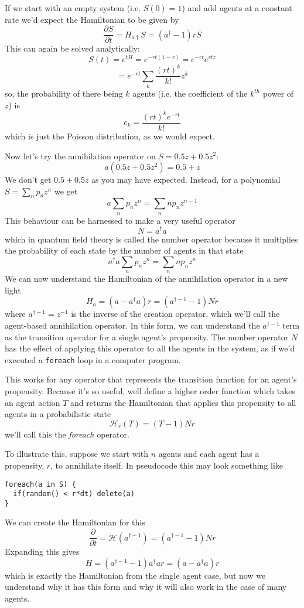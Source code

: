 \documentclass[letterpaper,twocolumn,10pt]{article}
\begin{document}
If we start with an empty system (i.e. $S(0) = 1$) and add agents at a constant rate we'd expect the Hamiltonian to be given by
\[
\frac{\partial S}{\partial t} = H_{a\dag}S = (a^\dag - 1)rS
\]
This can again be solved analytically:
\[
S(t) = e^{tH} = e^{-rt(1-z)} = e^{-rt}e^{rtz}
\]
\[
= e^{-rt}\sum_k \frac{(rt)^k}{k!}z^k
\]
so, the probability of there being $k$ agents (i.e. the coefficient of the $k^{th}$ power of $z$) is 
\[
c_k = \frac{(rt)^ke^{-rt}}{k!}
\]
which is just the Poisson distribution, as we would expect.

Now let's try the annihilation operator on $S = 0.5z + 0.5z^2$:
\[
a (0.5z + 0.5z^2) = 0.5 + z
\]
We don't get $0.5 + 0.5z$ as you may have expected. Instead, for a polynomial $S = \sum_n p_nz^n$ we get
\[
a \sum_n p_nz^n = \sum_n n p_n z^{n-1}
\]
This behaviour can be harnessed to make a very useful operator
\[
N = a^\dag a
\]
which in quantum field theory is called the number operator because it multiplies the probability of each state by the number of agents in that state
\[
a^\dag a \sum_n p_nz^n = \sum_n n p_n z^n
\]
We can now understand the Hamiltonian of the annihilation operator in a new light
\[
H_a = (a - a^\dag a)r = (a^{\dag -1} - 1)Nr
\]
where $a^{\dag -1} = z^{-1}$ is the inverse of the creation operator, which we'll call the agent-based annihilation operator. In this form, we can understand the $a^{\dag -1}$ term as the transition operator for a single agent's propensity. The number operator $N$ has the effect of applying this operator to all the agents in the system, as if we'd executed a \texttt{foreach} loop in a computer program.

This works for any operator that represents the transition function for an agent's propensity. Because it's so useful, well define a higher order function which takes an agent action $T$ and returns the Hamiltonian that applies this propensity to all agents in a probabilistic state
\[
\mathcal{H}_r(T) = (T - 1)Nr
\]
we'll call this the \textit{foreach} operator.

To illustrate this, suppose we start with $n$ agents and each agent has a propensity, $r$, to annihilate itself. In pseudocode this may look something like
\begin{verbatim}
foreach(a in S) {
  if(random() < r*dt) delete(a)
}
\end{verbatim}

We can create the Hamiltonian for this
\[
\frac{\partial}{\partial t} = \mathcal{H}(a^{\dag -1}) = (a^{\dag-1} - 1)Nr
\]
Expanding this gives
\[
H = (a^{\dag-1} - 1)a^\dag ar = (a - a^\dag a)r
\]
which is exactly the Hamiltonian from the single agent case, but now we understand why it has this form and why it will also work in the case of many agents.
\end{document}
